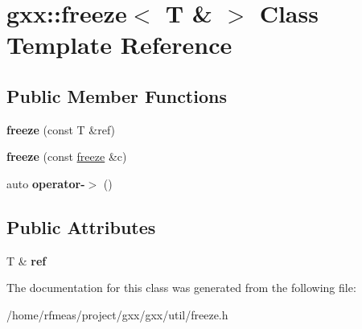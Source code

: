 \hypertarget{classgxx_1_1freeze_3_01T_01_6_01_4}{}\section{gxx\+:\+:freeze$<$ T \& $>$ Class Template Reference}
\label{classgxx_1_1freeze_3_01T_01_6_01_4}
\subsection*{Public Member Functions}
\begin{DoxyCompactItemize}
\item 
{\bfseries freeze} (const T \&ref)\hypertarget{classgxx_1_1freeze_3_01T_01_6_01_4_ac6d05dfb1117f3c685c96f3384b31b74}{}\label{classgxx_1_1freeze_3_01T_01_6_01_4_ac6d05dfb1117f3c685c96f3384b31b74}

\item 
{\bfseries freeze} (const \hyperlink{classgxx_1_1freeze}{freeze} \&c)\hypertarget{classgxx_1_1freeze_3_01T_01_6_01_4_a252498afb9fe65ce25b93e05342fc2fa}{}\label{classgxx_1_1freeze_3_01T_01_6_01_4_a252498afb9fe65ce25b93e05342fc2fa}

\item 
auto {\bfseries operator-\/$>$} ()\hypertarget{classgxx_1_1freeze_3_01T_01_6_01_4_a743e90026020e4d7c6b23370e27af18d}{}\label{classgxx_1_1freeze_3_01T_01_6_01_4_a743e90026020e4d7c6b23370e27af18d}

\end{DoxyCompactItemize}
\subsection*{Public Attributes}
\begin{DoxyCompactItemize}
\item 
T \& {\bfseries ref}\hypertarget{classgxx_1_1freeze_3_01T_01_6_01_4_acbf7660edfe7a54b071086557a7d5bf5}{}\label{classgxx_1_1freeze_3_01T_01_6_01_4_acbf7660edfe7a54b071086557a7d5bf5}

\end{DoxyCompactItemize}


The documentation for this class was generated from the following file\+:\begin{DoxyCompactItemize}
\item 
/home/rfmeas/project/gxx/gxx/util/freeze.\+h\end{DoxyCompactItemize}
